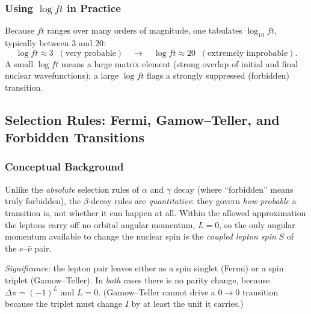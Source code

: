 \subsubsection*{Using $\log ft$ in Practice}
Because $ft$ ranges over many orders of magnitude, one tabulates $\log_{10}ft$,
typically between $3$ and $20$:
\begin{equation}
  \label{eq:lec09:logft_range}
  \log ft \approx 3 \;\;(\text{very probable})
  \quad\longrightarrow\quad
  \log ft \approx 20 \;\;(\text{extremely improbable}).
\end{equation}
A small $\log ft$ means a large matrix element (strong overlap of initial and
final nuclear wavefunctions); a large $\log ft$ flags a strongly suppressed
(forbidden) transition.

\subsection{Selection Rules: Fermi, Gamow--Teller, and Forbidden Transitions}
\label{subsec:lec09:selection}

\subsubsection*{Conceptual Background}
Unlike the \emph{absolute} selection rules of $\alpha$ and $\gamma$ decay (where
``forbidden'' means truly forbidden), the $\beta$-decay rules are
\emph{quantitative}: they govern \emph{how probable} a transition is, not whether
it can happen at all. Within the allowed approximation the leptons carry off no
orbital angular momentum, $L=0$, so the only angular momentum available to change
the nuclear spin is the \emph{coupled lepton spin} $S$ of the $e$--$\bar\nu$ pair.

\textit{Significance:} the lepton pair leaves either as a spin singlet (Fermi) or
a spin triplet (Gamow--Teller). In \emph{both} cases there is no parity change,
because $\Delta\pi=(-1)^L$ and $L=0$. (Gamow--Teller cannot drive a
$0\to0$ transition because the triplet must change $I$ by at least the unit it
carries.)

